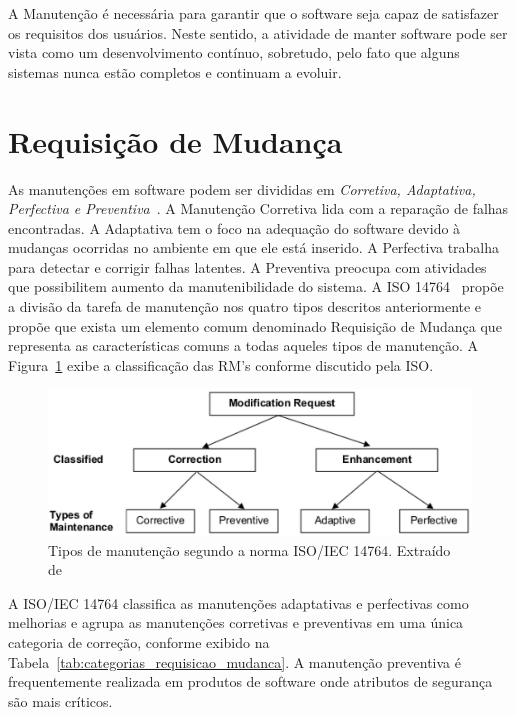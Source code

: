 A Manutenção é necessária para garantir que o software seja capaz de satisfazer
os requisitos dos usuários. Neste sentido, a atividade de manter software pode
ser vista como um desenvolvimento contínuo, sobretudo, pelo fato que alguns
sistemas nunca estão completos e continuam a evoluir.

\section{Requisição de Mudança}
\label{sec:requisição_de_mudanca}

As manutenções em software podem ser divididas em \textit{Corretiva, Adaptativa,
	Perfectiva e Preventiva}~\cite{Lientz:1980:SMM:601062,159342}.  A Manutenção
Corretiva lida com a reparação de falhas encontradas. A Adaptativa tem o foco na
adequação do software devido à mudanças ocorridas no ambiente em que ele está
inserido. A Perfectiva trabalha para detectar e corrigir falhas latentes. A
Preventiva preocupa com atividades que possibilitem aumento da manutenibilidade
do sistema.  A ISO 14764~\cite{1703974} propõe a divisão da tarefa de
manutenção nos quatro tipos descritos anteriormente e propõe que exista um
elemento comum denominado Requisição de Mudança que representa as
características comuns a todas aqueles tipos de manutenção. A
Figura~\ref{fig:modification-request} exibe a classificação das RM's conforme
discutido pela ISO\@.

\begin{figure}[hbtp] \centering \includegraphics[width=.75\textwidth]
	{chapter-intro/img/modification_request.eps} \caption{Tipos de manutenção
		segundo a norma ISO/IEC 14764. Extraído de~\cite{1703974}}
	\label{fig:modification-request} \end{figure}

A ISO/IEC 14764 classifica as manutenções adaptativas e perfectivas como
me\-lho\-ri\-as e agrupa as manutenções corretivas e preventivas em uma única
categoria de correção, conforme exibido na
Tabela~\ref{tab:categorias_requisicao_mudanca}. A manutenção preventiva é
frequentemente realizada em produtos de software onde atributos de segurança são
mais críticos.

